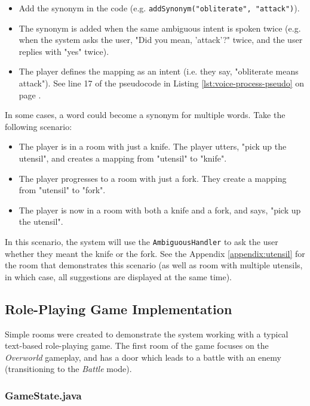 \documentclass[11pt]{article}
\begin{document}
\begin{itemize}
\item Add the synonym in the code (e.g. \texttt{addSynonym("obliterate", "attack")}).

\item The synonym is added when the same ambiguous intent is spoken twice (e.g. when the system asks the user, "Did you mean, 'attack'?" twice, and the user replies with "yes" twice).

\item The player defines the mapping as an intent (i.e. they say, "obliterate means attack"). See line 17 of the pseudocode in Listing \ref{lst:voice-process-pseudo} on page \pageref{lst:voice-process-pseudo}.
\end{itemize}

In some cases, a word could become a synonym for multiple words. Take the following scenario:

\begin{itemize}
\item The player is in a room with just a knife. The player utters, "pick up the utensil", and creates a mapping from "utensil" to "knife".

\item The player progresses to a room with just a fork. They create a mapping from "utensil" to "fork".

\item The player is now in a room with both a knife and a fork, and says, "pick up the utensil".
\end{itemize}

In this scenario, the system will use the \texttt{AmbiguousHandler} to ask the user whether they meant the knife or the fork. See the Appendix \ref{appendix:utensil} for the room that demonstrates this scenario (as well as room with multiple utensils, in which case, all suggestions are displayed at the same time).

\subsection{Role-Playing Game Implementation}

Simple rooms were created to demonstrate the system working with a typical text-based role-playing game. The first room of the game focuses on the \textit{Overworld} gameplay, and has a door which leads to a battle with an enemy (transitioning to the \textit{Battle} mode).

\subsubsection{GameState.java}
\end{document}
